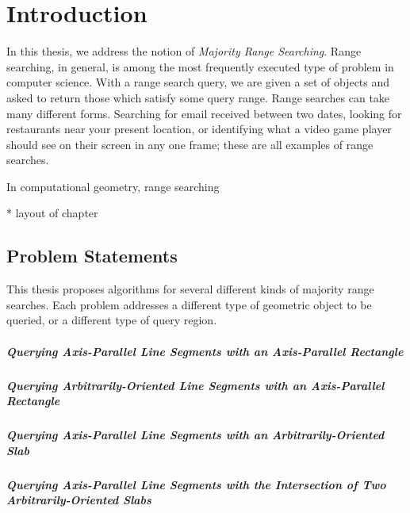 \chapter{Introduction}
\label{:intro}

In this thesis, we address the notion of \emph{Majority Range Searching}.  Range searching, in general, is among the most frequently executed type of problem in computer science. With a range search query, we are given a set of objects and asked to return those which satisfy some query range. Range searches can take many different forms. Searching for email received between two dates, looking for restaurants near your present location, or identifying what a video game player should see on their screen in any one frame; these are all examples of range searches.

In computational geometry, range searching 


* layout of chapter


\section{Problem Statements}
\label{:introduction:problems}

This thesis proposes algorithms for several different kinds of majority range searches.  Each problem addresses a different type of geometric object to be queried, or a different type of query region.

\paragraph{Querying Axis-Parallel Line Segments with an Axis-Parallel Rectangle}

\paragraph{Querying Arbitrarily-Oriented Line Segments with an Axis-Parallel Rectangle}

\paragraph{Querying Axis-Parallel Line Segments with an Arbitrarily-Oriented Slab}

\paragraph{Querying Axis-Parallel Line Segments with the Intersection of Two Arbitrarily-Oriented Slabs}

